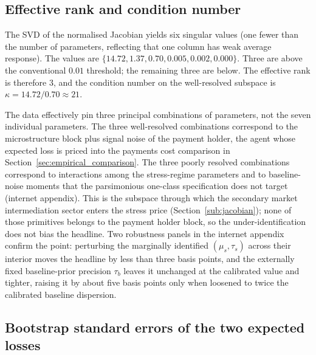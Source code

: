 \subsection{Effective rank and condition number}\label{sub:svd}

The SVD of the normalised Jacobian yields six singular values (one fewer than the number of parameters, reflecting that one column has weak average response). The values are $\{14.72, 1.37, 0.70, 0.005, 0.002, 0.000\}$. Three are above the conventional $0.01$ threshold; the remaining three are below. The effective rank is therefore $3$, and the condition number on the well-resolved subspace is $\kappa = 14.72/0.70 \approx 21$.

The data effectively pin three principal combinations of parameters, not the seven individual parameters. The three well-resolved combinations correspond to the microstructure block plus signal noise of the payment holder, the agent whose expected loss is priced into the payments cost comparison in Section~\ref{sec:empirical_comparison}. The three poorly resolved combinations correspond to interactions among the stress-regime parameters and to baseline-noise moments that the parsimonious one-class specification does not target (internet appendix). This is the subspace through which the secondary market intermediation sector enters the stress price (Section~\ref{sub:jacobian}); none of those primitives belongs to the payment holder block, so the under-identification does not bias the headline. Two robustness panels in the internet appendix confirm the point: perturbing the marginally identified $(\mu_s, \tau_s)$ across their interior moves the headline by less than three basis points, and the externally fixed baseline-prior precision $\tau_b$ leaves it unchanged at the calibrated value and tighter, raising it by about five basis points only when loosened to twice the calibrated baseline dispersion.

\subsection{Bootstrap standard errors of the two expected losses}\label{sub:bootstrap}

